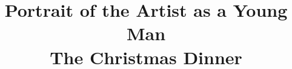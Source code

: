 ﻿%




\title{Portrait of the Artist as a Young Man\\
       The Christmas Dinner}



\maketitle


\begin{comment}

    \N1:
    A great fire,
    banked high and red,
    flamed in the grate
    and under the ivytwined branches of the chandelier
    the Christmas table was spread.
    They had come home a little late
    and still dinner was not ready:
    but it would be ready in a jiffy,
    his mother had said.
    They were waiting for the door to open
    and for the servants to come in,
    holding the big dishes covered
    with their heavy metal covers.

    \N2:
    All were waiting:
    uncle Charles, who sat far away in the shadow of the window,
    Dante and Mr~Casey,
    who sat in the easychairs at either side of the hearth,
    Stephen, seated on a chair between them,
    his feet resting on the toasted boss.
    Mr~Dedalus looked at himself in the pierglass above the mantelpiece,
    waxed out his moustache ends
    and then,
    parting his coat tails,
    stood with his back to the glowing fire:
    and still from time to time
    he withdrew a hand from his coat tail
    to wax out one of his moustache ends.
    Mr~Casey leaned his head to one side
    and, smiling,
    tapped the gland of his neck with his fingers.
    And Stephen smiled too
    for he knew now that it was not true
    that Mr~Casey had a purse of silver in his throat.
    He smiled to think how the silvery noise which Mr~Casey used to make
    had deceived him.
    And when he had tried to open Mr~Casey’s hand
    to see if the purse of silver was hidden there
    he had seen that the fingers could not be straightened out:
    and Mr~Casey had told him
    that he had got those three cramped fingers
    making a birthday present for Queen Victoria.
    Mr~Casey tapped the gland of his neck
    and smiled at Stephen with sleepy eyes:
    and Mr~Dedalus said to him:


\end{comment}
